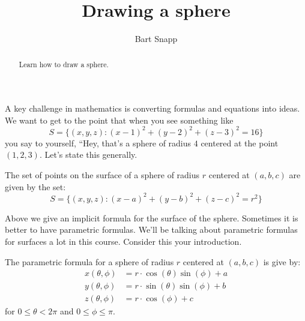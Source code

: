 \documentclass{ximera}
\author{Bart Snapp}
\title[Dig-In:]{Drawing a sphere}
\begin{document}
\begin{abstract}
  Learn how to draw a sphere.
\end{abstract}
\maketitle

A key challenge in mathematics is converting formulas and equations
into ideas. We want to get to the point that when you see something
like
\[
S = \{(x,y,z):(x-1)^2+(y-2)^2+(z-3)^2=16\}
\]
you say to yourself, ``Hey, that's a sphere of radius $4$ centered at
the point $(1,2,3)$. Let's state this generally.
\begin{theorem}
  The set of points on the surface of a sphere of radius $r$ centered
  at $(a,b,c)$ are given by the set:
  \[
  S = \{(x,y,z):(x-a)^2+(y-b)^2+(z-c)^2=r^2\}
  \]
\end{theorem}
Above we give an implicit formula for the surface of the
sphere. Sometimes it is better to have parametric formulas. We'll be
talking about parametric formulas for surfaces a lot in this
course. Consider this your introduction.
\begin{theorem}
  The parametric formula for a sphere of radius $r$ centered at
  $(a,b,c)$ is give by:
  \begin{align*}
    x(\theta,\phi) &=r\cdot\cos(\theta)\sin(\phi)+a\\
    y(\theta,\phi) &=r\cdot\sin(\theta)\sin(\phi)+b\\
    z(\theta,\phi) &=r\cdot\cos(\phi)+c
  \end{align*}
  for $0\le\theta< 2\pi$ and $0\le \phi\le \pi$.
\end{theorem}
\end{document}
